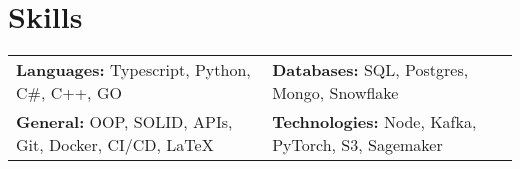
\vspace{5 pt - 0.5 cm}
\section{Skills}

\begin{center}
    \begin{tabularx}{\linewidth}{@{}X@{} @{}X@{}}
    \textbf{Languages:} Typescript, Python, C\#, C++, GO & \textbf{Databases:} SQL, Postgres, Mongo, Snowflake \\ 
    \textbf{General:} OOP, SOLID, APIs, Git, Docker, CI/CD, LaTeX  & \textbf{Technologies:} Node, Kafka, PyTorch, S3, Sagemaker \\     
    \end{tabularx}
\end{center}





